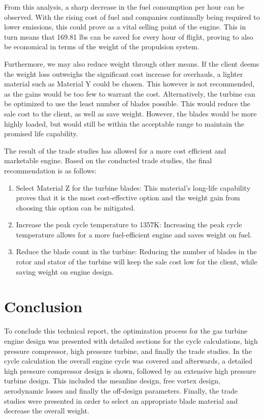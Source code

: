 \documentclass[12pt, letter]{report}
\begin{document}
From this analysis, a sharp decrease in the fuel consumption per hour can be observed. With the rising cost of fuel and companies continually being required to lower emissions, this could prove as a vital selling point of the engine. This in turn means that 169.81 lbs can be saved for every hour of flight, proving to also be economical in terms of the weight of the propulsion system.

Furthermore, we may also reduce weight through other means. If the client deems the weight loss outweighs the significant cost increase for overhauls, a lighter material such as Material Y could be chosen. This however is not recommended, as the gains would be too few to warrant the cost. Alternatively, the turbine can be optimized to use the least number of blades possible. This would reduce the sale cost to the client, as well as save weight. However, the blades would be more highly loaded, but would still be within the acceptable range to maintain the promised life capability.

The result of the trade studies has allowed for a more cost efficient and marketable engine. Based on the conducted trade studies, the final recommendation is as follows:
\begin{enumerate}
    \item Select Material Z for the turbine blades: This material’s long-life capability proves that it is the most cost-effective option and the weight gain from choosing this option can be mitigated.
    \item Increase the peak cycle temperature to 1357K: Increasing the peak cycle temperature allows for a more fuel-efficient engine and saves weight on fuel.
    \item Reduce the blade count in the turbine: Reducing the number of blades in the rotor and stator of the turbine will keep the sale cost low for the client, while saving weight on engine design.
\end{enumerate}
\clearpage

\chapter{Conclusion}

To conclude this technical report, the optimization process for the gas turbine engine design was presented with detailed sections for the cycle calculations, high pressure compressor, high pressure turbine, and finally the trade studies. In the cycle calculation the overall engine cycle was covered and afterwards, a detailed high pressure compressor design is shown, followed by an extensive high pressure turbine design. This included the meanline design, free vortex design, aerodynamic losses and finally the off-design parameters. Finally, the trade studies were presented in order to select an appropriate blade material and decrease the overall weight.
\end{document}
